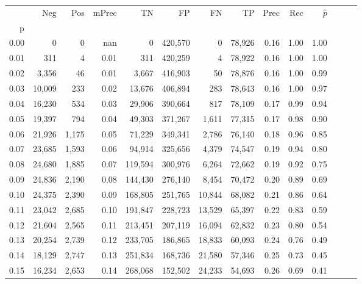 \begin{tabular}{rrrrrrrrrrrrrr}
\toprule
{} &     Neg &    Pos & mPrec &       TN &       FP &      FN &      TP &  Prec &   Rec & $\hat{p}$ \\
p    &         &        &       &          &          &         &         &       &       &           \\
\midrule
0.00 &       0 &      0 &   nan &        0 &  420,570 &       0 &  78,926 &  0.16 &  1.00 &      1.00 \\
0.01 &     311 &      4 &  0.01 &      311 &  420,259 &       4 &  78,922 &  0.16 &  1.00 &      1.00 \\
0.02 &   3,356 &     46 &  0.01 &    3,667 &  416,903 &      50 &  78,876 &  0.16 &  1.00 &      0.99 \\
0.03 &  10,009 &    233 &  0.02 &   13,676 &  406,894 &     283 &  78,643 &  0.16 &  1.00 &      0.97 \\
0.04 &  16,230 &    534 &  0.03 &   29,906 &  390,664 &     817 &  78,109 &  0.17 &  0.99 &      0.94 \\
0.05 &  19,397 &    794 &  0.04 &   49,303 &  371,267 &   1,611 &  77,315 &  0.17 &  0.98 &      0.90 \\
0.06 &  21,926 &  1,175 &  0.05 &   71,229 &  349,341 &   2,786 &  76,140 &  0.18 &  0.96 &      0.85 \\
0.07 &  23,685 &  1,593 &  0.06 &   94,914 &  325,656 &   4,379 &  74,547 &  0.19 &  0.94 &      0.80 \\
0.08 &  24,680 &  1,885 &  0.07 &  119,594 &  300,976 &   6,264 &  72,662 &  0.19 &  0.92 &      0.75 \\
0.09 &  24,836 &  2,190 &  0.08 &  144,430 &  276,140 &   8,454 &  70,472 &  0.20 &  0.89 &      0.69 \\
0.10 &  24,375 &  2,390 &  0.09 &  168,805 &  251,765 &  10,844 &  68,082 &  0.21 &  0.86 &      0.64 \\
0.11 &  23,042 &  2,685 &  0.10 &  191,847 &  228,723 &  13,529 &  65,397 &  0.22 &  0.83 &      0.59 \\
0.12 &  21,604 &  2,565 &  0.11 &  213,451 &  207,119 &  16,094 &  62,832 &  0.23 &  0.80 &      0.54 \\
0.13 &  20,254 &  2,739 &  0.12 &  233,705 &  186,865 &  18,833 &  60,093 &  0.24 &  0.76 &      0.49 \\
0.14 &  18,129 &  2,747 &  0.13 &  251,834 &  168,736 &  21,580 &  57,346 &  0.25 &  0.73 &      0.45 \\
0.15 &  16,234 &  2,653 &  0.14 &  268,068 &  152,502 &  24,233 &  54,693 &  0.26 &  0.69 &      0.41 \\

\end{tabular}
